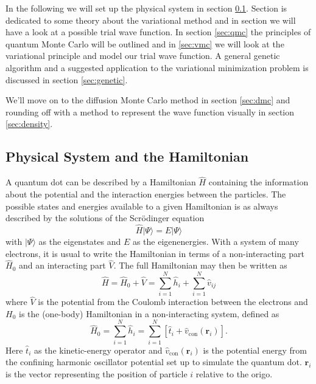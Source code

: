 \documentclass[aps,prb,twocolumn,floatfix]{revtex4}
\renewcommand{\vec}{\mathbf}
\begin{document}
In the following we will set up the physical system in section \ref{sec:hamiltonian}. Section \label{sec:varmethods} is dedicated to some theory about the variational method and in section \label{sec:wavefunction} we will have a look at a possible trial wave function. In section \ref{sec:qmc} the principles of quantum Monte Carlo will be outlined and in \ref{sec:vmc} we will look at the variational principle and model our trial wave function. A general genetic algorithm and a suggested application to the variational minimization problem is discussed in section \ref{sec:genetic}.

We'll move on to the diffusion Monte Carlo method in section \ref{sec:dmc} and rounding off with a method to represent the wave function visually in section \ref{sec:density}.


\subsection{Physical System and the Hamiltonian}\label{sec:hamiltonian}


A quantum dot can be described by a Hamiltonian $\hat H$ containing the information about the potential and the interaction energies between the particles. The possible states and energies available to a given Hamiltonian is as always described by the solutions of the Scrödinger equation
\begin{equation}
    \hat H | \Psi \rangle = E | \Psi \rangle
\end{equation}
with $|\Psi \rangle$ as the eigenstates and $E$ as the eigenenergies. With a system of many electrons, it is usual to write the Hamiltonian in terms of a non-interacting part $\hat H_0$ and an interacting part $\hat V$. The full Hamiltonian may then be written as
\begin{equation}
    \hat H = \hat H_0 + \hat V = \sum_{i = 1}^N \hat h_i + \sum_{i=1}^{N} \hat v_{ij}
\end{equation} 
where $\hat V$ is the potential from the Coulomb interaction between the electrons and $H_0$ is the (one-body) Hamiltonian in a non-interacting system, defined as
\begin{equation}
    \hat H_0 = \sum_{i=1}^{N} \hat h_{i} = \sum_{i=1}^{N} \left[ \hat t_{i} + \hat v_{\text{con}}(\vec r_i) \right] .
\end{equation}
Here $\hat t_i$ as the kinetic-energy operator and $\hat v_{\text{con}}(\vec r_i)$ is the potential energy from the confining harmonic oscillator potential set up to simulate the quantum dot. $\vec r_i$ is the vector representing the position of particle $i$ relative to the origo\cite{PhysRevB.84.115302}.
\end{document}
